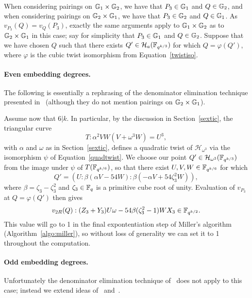 When considering pairings on $\mathbb{G}_{1} \times \mathbb{G}_{2}$, we have that $P_3 \in \mathbb{G}_{1}$ and $Q \in \mathbb{G}_{2}$, and when considering pairings on $\mathbb{G}_{2} \times \mathbb{G}_{1}$, we have that $P_3 \in \mathbb{G}_{2}$ and $Q \in \mathbb{G}_{1}$.
As $v_{P_3}(Q) = v_{Q}(P_3)$, exactly the same arguments apply to $\mathbb{G}_{1} \times \mathbb{G}_{2}$ as to $\mathbb{G}_{2} \times \mathbb{G}_{1}$ in this case; 
say for simplicity that $P_3 \in \mathbb{G}_{1}$ and $Q \in \mathbb{G}_{2}$.
Suppose that we have chosen $Q$ such that there exists $Q' \in \mathcal{H}_a(\mathbb{F}_{q^{k/3}})$ for which $Q = \varphi(Q')$, where $\varphi$ is the 
cubic twist isomorphism from Equation~\ref{twistiso}.

\paragraph*{Even embedding degrees.}

The following is essentially a rephrasing of the denominator elimination technique presented in~\cite{2010/Gu} (although they do not mention pairings on $\mathbb{G}_{2} \times \mathbb{G}_{1}$).

Assume now that $6|k$. In particular, by the discussion in
Section~\ref{sextic}, the triangular curve
\[T:\alpha^2VW(V + \omega^3W) = U^3,\]
with $\alpha$ and $\omega$ as in Section~\ref{sextic},
defines a quadratic twist of $\mathcal{H}_{\omega^3}$ via the isomorphism
$\psi$ of Equation~\ref{quadtwist}.
We choose our point $Q' \in \mathcal{H}_{\omega^3}(\mathbb{F}_{q^{k/3}})$ from the
image under $\psi$ of $T(\mathbb{F}_{q^{k/6}})$, so that there exist $U, V, W \in \mathbb{F}_{q^{k/6}}$ for which
$$Q' = (U:\beta(\alpha V - 54W) : \beta(-\alpha V + 54\zeta_3^2 W)),$$
where $\beta = \zeta_3-\zeta_3^2$ and 
$\zeta_3 \in \mathbb{F}_{q}$ is a primitive cube root of unity.
Evaluation of $v_{P_3}$ at $Q = \varphi(Q')$ then gives
\[v_{2R}(Q) : (Z_3 + Y_3) U\omega - 54\beta(\zeta_3^2-1)W X_3 \in \mathbb{F}_{q^{k/2}}.\]
This value will go to 1 in the final expontentiation step of Miller's algorithm 
(Algorithm~\ref{algo:miller}), so without loss of generality we can set it to 1 throughout the computation.

\paragraph*{Odd embedding degrees.}

Unfortunately the denominator elimination technique of~\cite{2010/Gu} does not apply to this case;
instead we extend ideas of~\cite{2008/lin} and~\cite{2009/deg15}.

